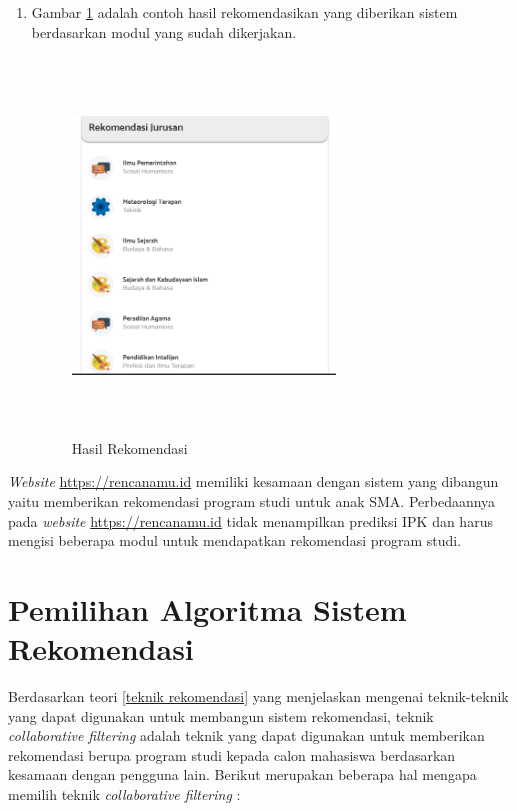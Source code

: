 \begin{enumerate}
    \item Gambar \ref{gambar36} adalah contoh hasil rekomendasikan yang diberikan sistem berdasarkan modul yang sudah dikerjakan.
    
    \begin{figure}[H]
        \centering
        \includegraphics[width = 7cm, height = 10cm ]{doc/DokumenSkripsi/Gambar/gambar36.PNG}
        \caption{Hasil Rekomendasi}
        \label{gambar36}
    \end{figure}
    
\end{enumerate}

\textit{Website} \url{https://rencanamu.id} memiliki kesamaan dengan sistem yang dibangun yaitu memberikan rekomendasi program studi untuk anak SMA. Perbedaannya pada \textit{website} \url{https://rencanamu.id} tidak menampilkan prediksi IPK dan harus mengisi beberapa modul untuk mendapatkan rekomendasi program studi. 

\section{Pemilihan Algoritma Sistem Rekomendasi}
Berdasarkan teori \ref{teknik rekomendasi} yang menjelaskan mengenai teknik-teknik yang dapat digunakan untuk membangun sistem rekomendasi, teknik \textit{collaborative filtering} adalah teknik yang dapat digunakan untuk memberikan rekomendasi berupa program studi kepada calon mahasiswa berdasarkan kesamaan dengan pengguna lain. Berikut merupakan beberapa hal mengapa memilih teknik \textit{collaborative filtering} :

